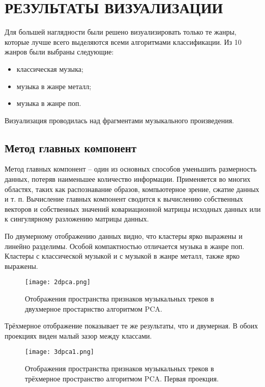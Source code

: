 \section{РЕЗУЛЬТАТЫ ВИЗУАЛИЗАЦИИ}
\label{sec:visualization}


Для большей наглядности были решено визуализировать только те жанры, которые лучше всего выделяются всеми алгоритмами классификации. Из 10 жанров были выбраны следующие:
\begin{itemize}
\item классическая музыка;
\item музыка в жанре металл;
\item музыка в жанре поп.
\end{itemize}

Визуализация проводилась над фрагментами музыкального произведения.

\subsection{Метод главных компонент} 
\label{sub:pca}
Метод главных компонент -- один из основных способов уменьшить размерность данных, потеряв наименьшее количество информации. Применяется во многих областях, таких как распознавание образов, компьютерное зрение, сжатие данных и т. п. Вычисление главных компонент сводится к вычислению собственных векторов и собственных значений ковариационной матрицы исходных данных или к сингулярному разложению матрицы данных. 



По двумерному отображению данных видно, что кластеры ярко выражены и линейно разделимы. Особой компактностью отличается музыка в жанре поп. Кластеры с классической музыкой и с музыкой в жанре металл, также ярко выражены.
\begin{figure}[h]
\centering
  \texttt{[image: 2dpca.png]}
  \caption{Отображения пространства  признаков музыкальных треков в двухмерное простарнство алгоритмом PCA.}
  \label{fig:results:2dtsne}
\end{figure}

Трёхмерное отображение показывает те же результаты, что и двумерная. В обоих проекциях виден малый зазор между классами.

\begin{figure}[!h]
\centering
  \texttt{[image: 3dpca1.png]}
  \caption{Отображения пространства  признаков музыкальных треков в трёхмерное пространство алгоритмом PCA. Первая проекция. }
  \label{fig:results:2dtsne}
\end{figure}


